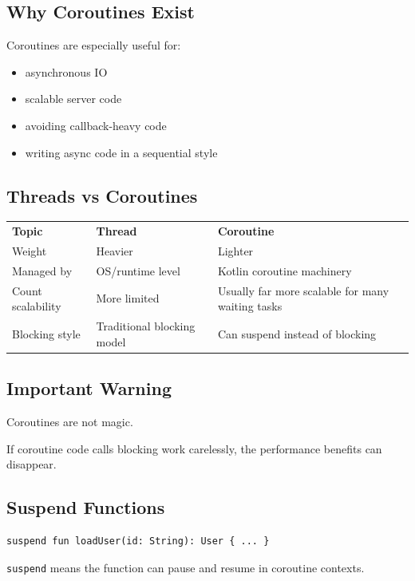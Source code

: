 \documentclass[11pt,a4paper]{article}
\begin{document}
\subsection{Why Coroutines Exist}

Coroutines are especially useful for:
\begin{itemize}
    \item asynchronous IO
    \item scalable server code
    \item avoiding callback-heavy code
    \item writing async code in a sequential style
\end{itemize}

\subsection{Threads vs Coroutines}

\begin{longtable}{p{} p{} p{}}
\textbf{Topic} & \textbf{Thread} & \textbf{Coroutine} \\
Weight & Heavier & Lighter \\
Managed by & OS/runtime level & Kotlin coroutine machinery \\
Count scalability & More limited & Usually far more scalable for many waiting tasks \\
Blocking style & Traditional blocking model & Can suspend instead of blocking \\
\end{longtable}

\subsection{Important Warning}

Coroutines are not magic.

If coroutine code calls blocking work carelessly, the performance benefits can disappear.

\subsection{Suspend Functions}

\begin{lstlisting}[style=kazekotlin]
suspend fun loadUser(id: String): User { ... }
\end{lstlisting}

\texttt{suspend} means the function can pause and resume in coroutine contexts.
\end{document}
